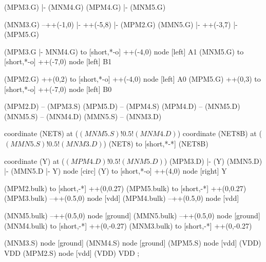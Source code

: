 \begin{circuitikz}[american]
	(MPM3.G) |- (MNM4.G)
	(MPM4.G) |- (MNM5.G)
	
	(MNM3.G) --++(-1,0) |- ++(-5,8) |- (MPM2.G)
	(MMN5.G) |- ++(-3,7) |- (MPM5.G)
	
	(MPM3.G |- MNM4.G) to [short,*-o] ++(-4,0) node [left] {A1}
	(MNM5.G) to [short,*-o] ++(-7,0) node [left] {B1}
	
	(MPM2.G) ++(0,2) to [short,*-o] ++(-4,0) node [left] {A0}
	(MPM5.G) ++(0,3) to [short,*-o] ++(-7,0) node [left] {B0}
	
	(MPM2.D) -- (MPM3.S)
	(MPM5.D) -- (MPM4.S)
	(MPM4.D) -- (MNM5.D)
	(MNM5.S) -- (MNM4.D)
	(MMN5.S) -- (MNM3.D)
	
	coordinate (NET8) at ($(MNM5.S)!0.5!(MNM4.D)$)
	coordinate (NET8B) at ($(MMN5.S)!0.5!(MNM3.D)$)
	(NET8) to [short,*-*] (NET8B)
	
	coordinate (Y) at ($(MPM4.D)!0.5!(MNM5.D)$)
	(MPM3.D) |- (Y)
	(MMN5.D) |- (MMN5.D |- Y) node [circ] {}
	(Y) to [short,*-o] ++(4,0) node [right] {Y}
	
	(MPM2.bulk) to [short,-*] ++(0,0.27)
	(MPM5.bulk) to [short,-*] ++(0,0.27)
	(MPM3.bulk) --++(0.5,0) node [vdd]{}
	(MPM4.bulk) --++(0.5,0) node [vdd]{}
	
	(MNM5.bulk) --++(0.5,0) node [ground]{}
	(MMN5.bulk) --++(0.5,0) node [ground]{}
	(MNM4.bulk) to [short,-*] ++(0,-0.27)	
	(MNM3.bulk) to [short,-*] ++(0,-0.27)


	(MNM3.S) node [ground] {}
	(MNM4.S) node [ground] {}
	(MPM5.S) node [vdd] (VDD) {VDD}
	(MPM2.S) node [vdd] (VDD) {VDD}
;

\end{circuitikz}
